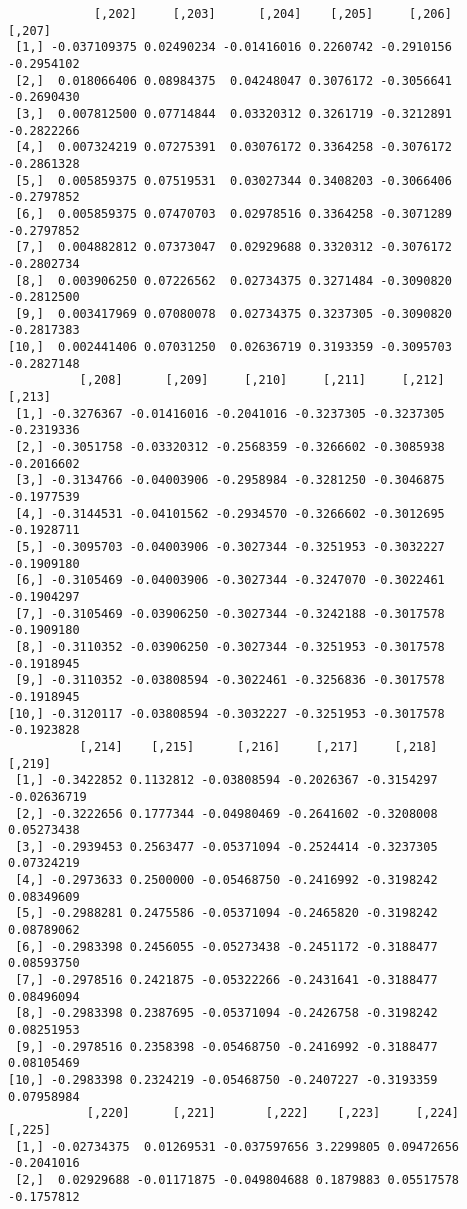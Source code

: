 \documentclass[
  letterpaper,
  DIV=11,
  numbers=noendperiod]{scrreprt}
\begin{document}
\begin{verbatim}
            [,202]     [,203]      [,204]    [,205]     [,206]     [,207]
 [1,] -0.037109375 0.02490234 -0.01416016 0.2260742 -0.2910156 -0.2954102
 [2,]  0.018066406 0.08984375  0.04248047 0.3076172 -0.3056641 -0.2690430
 [3,]  0.007812500 0.07714844  0.03320312 0.3261719 -0.3212891 -0.2822266
 [4,]  0.007324219 0.07275391  0.03076172 0.3364258 -0.3076172 -0.2861328
 [5,]  0.005859375 0.07519531  0.03027344 0.3408203 -0.3066406 -0.2797852
 [6,]  0.005859375 0.07470703  0.02978516 0.3364258 -0.3071289 -0.2797852
 [7,]  0.004882812 0.07373047  0.02929688 0.3320312 -0.3076172 -0.2802734
 [8,]  0.003906250 0.07226562  0.02734375 0.3271484 -0.3090820 -0.2812500
 [9,]  0.003417969 0.07080078  0.02734375 0.3237305 -0.3090820 -0.2817383
[10,]  0.002441406 0.07031250  0.02636719 0.3193359 -0.3095703 -0.2827148
          [,208]      [,209]     [,210]     [,211]     [,212]     [,213]
 [1,] -0.3276367 -0.01416016 -0.2041016 -0.3237305 -0.3237305 -0.2319336
 [2,] -0.3051758 -0.03320312 -0.2568359 -0.3266602 -0.3085938 -0.2016602
 [3,] -0.3134766 -0.04003906 -0.2958984 -0.3281250 -0.3046875 -0.1977539
 [4,] -0.3144531 -0.04101562 -0.2934570 -0.3266602 -0.3012695 -0.1928711
 [5,] -0.3095703 -0.04003906 -0.3027344 -0.3251953 -0.3032227 -0.1909180
 [6,] -0.3105469 -0.04003906 -0.3027344 -0.3247070 -0.3022461 -0.1904297
 [7,] -0.3105469 -0.03906250 -0.3027344 -0.3242188 -0.3017578 -0.1909180
 [8,] -0.3110352 -0.03906250 -0.3027344 -0.3251953 -0.3017578 -0.1918945
 [9,] -0.3110352 -0.03808594 -0.3022461 -0.3256836 -0.3017578 -0.1918945
[10,] -0.3120117 -0.03808594 -0.3032227 -0.3251953 -0.3017578 -0.1923828
          [,214]    [,215]      [,216]     [,217]     [,218]      [,219]
 [1,] -0.3422852 0.1132812 -0.03808594 -0.2026367 -0.3154297 -0.02636719
 [2,] -0.3222656 0.1777344 -0.04980469 -0.2641602 -0.3208008  0.05273438
 [3,] -0.2939453 0.2563477 -0.05371094 -0.2524414 -0.3237305  0.07324219
 [4,] -0.2973633 0.2500000 -0.05468750 -0.2416992 -0.3198242  0.08349609
 [5,] -0.2988281 0.2475586 -0.05371094 -0.2465820 -0.3198242  0.08789062
 [6,] -0.2983398 0.2456055 -0.05273438 -0.2451172 -0.3188477  0.08593750
 [7,] -0.2978516 0.2421875 -0.05322266 -0.2431641 -0.3188477  0.08496094
 [8,] -0.2983398 0.2387695 -0.05371094 -0.2426758 -0.3198242  0.08251953
 [9,] -0.2978516 0.2358398 -0.05468750 -0.2416992 -0.3188477  0.08105469
[10,] -0.2983398 0.2324219 -0.05468750 -0.2407227 -0.3193359  0.07958984
           [,220]      [,221]       [,222]    [,223]     [,224]     [,225]
 [1,] -0.02734375  0.01269531 -0.037597656 3.2299805 0.09472656 -0.2041016
 [2,]  0.02929688 -0.01171875 -0.049804688 0.1879883 0.05517578 -0.1757812

\end{verbatim}
\end{document}
